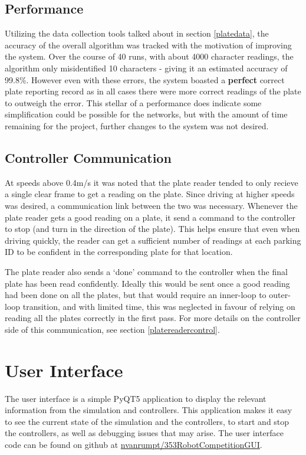 \documentclass[titlepage, twocolumn]{article}
\begin{document}
\subsection{Performance}

Utilizing the data collection tools talked about in section \ref{platedata}, the accuracy of the overall algorithm was tracked with the motivation of improving the system. Over the course of 40 runs, with about 4000 character readings, the algorithm only misidentified 10 characters - giving it an estimated accuracy of 99.8\%. However even with these errors, the system boasted a {\bf perfect} correct plate reporting record as in all cases there were more correct readings of the plate to outweigh the error. This stellar of a performance does indicate some simplification could be possible for the networks, but with the amount of time remaining for the project, further changes to the system was not desired.

\subsection{Controller Communication}

At speeds above 0.4m/s it was noted that the plate reader tended to only recieve a single clear frame to get a reading on the plate. Since driving at higher speeds was desired, a communication link between the two was necessary. Whenever the plate reader gets a good reading on a plate, it send a command to the controller to stop (and turn in the direction of the plate). This helps ensure that even when driving quickly, the reader can get a sufficient number of readings at each parking ID to be confident in the corresponding plate for that location. 

The plate reader also sends a `done' command to the controller when the final plate has been read confidently. Ideally this would be sent once a good reading had been done on all the plates, but that would require an inner-loop to outer-loop transition, and with limited time, this was neglected in favour of relying on reading all the plates correctly in the first pass. For more details on the controller side of this communication, see section \ref{platereadercontrol}.

\section{User Interface}

The user interface is a simple PyQT5 application to display the relevant information from the simulation and controllers. This application makes it easy to see the current state of the simulation and the controllers, to start and stop the controllers, as well as debugging issues that may arise. The user interface code can be found on github at \href{https://github.com/nvanrumpt/353RobotCompetitionGUI}{nvanrumpt/353RobotCompetitionGUI}.
\end{document}
